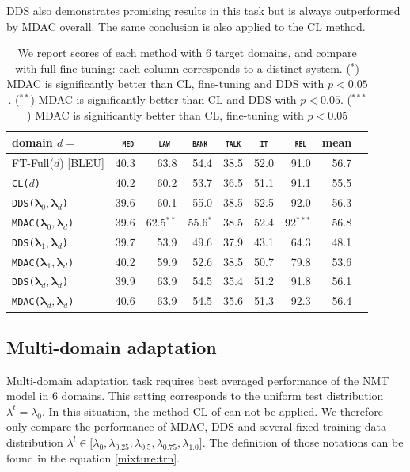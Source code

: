 \documentclass[11pt]{article}
\newcommand{\domain}[1]{\texttt{\textsc{#1}}}
\newcommand{\system}[1]{\texttt{{#1}}}
\newcommand{\vlambda}{\ensuremath{\boldsymbol\lambda}\xspace} %
\begin{document}
DDS also demonstrates promising results in this task but is always outperformed by MDAC overall. The same conclusion is also applied to the CL method.

\begin{table}[htbp]
  \centering \small
  \begin{tabular}{|l|*8{r|}} \hline
    domain \hfill $d=$ & \multicolumn{1}{c|}{\domain{ med}} & \multicolumn{1}{c|}{\domain{ law}} & \multicolumn{1}{c|}{\domain{bank}} & \multicolumn{1}{c|}{\domain{talk}} & \multicolumn{1}{c|}{\domain{ it }} & \multicolumn{1}{c|}{\domain{ rel}} & \multicolumn{1}{c|}{mean} \\ \hline
    FT-Full($d$) \hfill [BLEU] &40.3&63.8&54.4&38.5&52.0&91.0&56.7\\ \hline
    \hline
    \system{CL($d$)} &40.2&60.2&53.7&36.5&51.1&91.1&55.5\\ \hline
    \system{DDS($\vlambda_0, \vlambda_d$)} &39.6&60.1&55.0&38.5&52.5&92.0&56.3\\
    \system{MDAC($\vlambda_0, \vlambda_d$)} &39.6&62.5$^{**}$&55.6$^{*}$&38.5&52.4&92$^{***}$&56.8\\
     \hline
    \system{DDS($\vlambda_1, \vlambda_d$)} &39.7&53.9&49.6&37.9&43.1&64.3&48.1\\
    \system{MDAC($\vlambda_1, \vlambda_d$)} &40.2&59.9&52.6&38.5&50.7&79.8&53.6\\ \hline
    \system{DDS($\vlambda_d, \vlambda_d$)} &39.9&63.9&54.5&35.4&51.2&91.8&56.1\\
    \system{MDAC($\vlambda_d, \vlambda_d$)}&40.6&63.9&54.5&35.6&51.3&92.3&56.4\\
    \hline
  \end{tabular}
  \caption{We report scores of each method with 6 target domains, and compare with full fine-tuning: each column corresponds to a distinct system. ($^{*}$) MDAC is significantly better than CL, fine-tuning and DDS with $p<0.05$. ($^{**}$) MDAC is significantly better than CL and DDS with $p<0.05$. ($^{***}$) MDAC is significantly better than CL, fine-tuning with $p<0.05$}
  \label{tab:da}
\end{table}

\subsection{Multi-domain adaptation}\label{ssec:mda}

Multi-domain adaptation task requires best averaged performance of the NMT model in 6 domains. This setting corresponds to the uniform test distribution $\lambda^t = \lambda_0$. In this situation, the method CL of \citet{Zhang19curriculum} can not be applied. We therefore only compare the performance of MDAC, DDS and several fixed training data distribution $\lambda^l \in \big[ \lambda_0, \lambda_{0.25}, \lambda_{0.5}, \lambda_{0.75}, \lambda_{1.0}\big]$. The definition of those notations can be found in the equation \ref{mixture:trn}.
\end{document}
